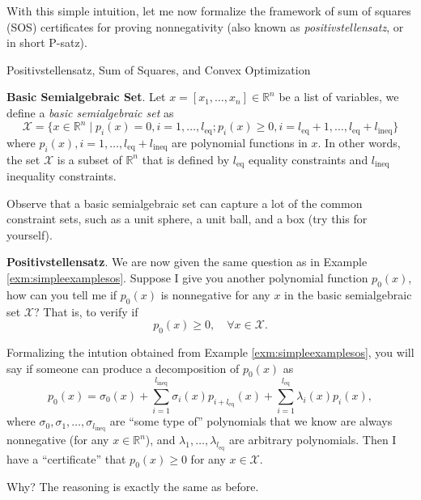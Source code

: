 \documentclass[
]{book}
\theoremstyle{definition}
\theoremstyle{definition}
\theoremstyle{definition}
\theoremstyle{definition}
\theoremstyle{remark}
\begin{document}
With this simple intuition, let me now formalize the framework of sum of squares (SOS) certificates for proving nonnegativity (also known as \emph{positivstellensatz}, or in short P-satz).

Positivstellensatz, Sum of Squares, and Convex Optimization

\textbf{Basic Semialgebraic Set}. Let \(x = [x_1,\dots,x_n] \in \mathbb{R}^n\) be a list of variables, we define a \emph{basic semialgebraic set} as
\begin{equation}
\mathcal{X} = \{ x \in \mathbb{R}^{n} \mid p_i(x) = 0, i = 1,\dots,l_{\mathrm{eq}}; p_i(x) \geq 0, i=l_{\mathrm{eq}}+1,\dots,l_{\mathrm{eq}} + l_{\mathrm{ineq}} \}
\label{eq:basic-semialgebraic-set}
\end{equation}
where \(p_i(x),i=1,\dots,l_{\mathrm{eq}}+l_{\mathrm{ineq}}\) are polynomial functions in \(x\). In other words, the set \(\mathcal{X}\) is a subset of \(\mathbb{R}^n\) that is defined by \(l_{\mathrm{eq}}\) equality constraints and \(l_{\mathrm{ineq}}\) inequality constraints.

Observe that a basic semialgebraic set can capture a lot of the common constraint sets, such as a unit sphere, a unit ball, and a box (try this for yourself).

\textbf{Positivstellensatz}. We are now given the same question as in Example \ref{exm:simpleexamplesos}. Suppose I give you another polynomial function \(p_0(x)\), how can you tell me if \(p_0(x)\) is nonnegative for any \(x\) in the basic semialgebraic set \(\mathcal{X}\)? That is, to verify if
\[
p_0(x) \geq 0, \quad \forall x \in \mathcal{X}.
\]

Formalizing the intution obtained from Example \ref{exm:simpleexamplesos}, you will say if someone can produce a decomposition of \(p_0(x)\) as
\begin{equation}
p_0(x) = \sigma_0(x) + \sum_{i=1}^{l_{\mathrm{ineq}}} \sigma_i(x) p_{i + l_{\mathrm{eq}}}(x) + \sum_{i=1}^{l_{\mathrm{eq}}} \lambda_i(x) p_{i}(x),
\label{eq:p-satz-putinar}
\end{equation}
where \(\sigma_0,\sigma_1,\dots,\sigma_{l_{\mathrm{ineq}}}\) are ``some type of'' polynomials that we know are always nonnegative (for any \(x \in \mathbb{R}^n\)), and \(\lambda_1,\dots,\lambda_{l_{\mathrm{eq}}}\) are arbitrary polynomials. Then I have a ``certificate'' that \(p_0(x) \geq 0\) for any \(x \in \mathcal{X}\).

Why? The reasoning is exactly the same as before.
\end{document}
